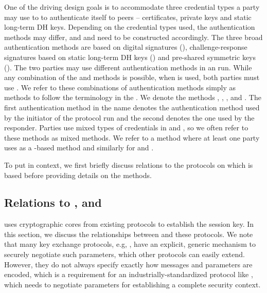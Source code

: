 One of the driving design goals is to accommodate three credential types
a party may use to to authenticate itself to peers -- certificates, private keys
and static long-term DH keys. Depending on the credential types used, the authentication methods may differ, and \mAuthi{} and \mAuthr{} need to be constructed accordingly.
%
%
The three broad authentication methods are based on digital signatures (\mSig), challenge-response signatures based on static long-term DH keys (\mStat) and pre-shared symmetric keys (\mPsk). The two parties may use different authentication methods in an \mEdhoc{} run.
%
While any combination of the \mSig{} and \mStat{} methods is possible, when \mPsk{} is used, both parties must use \mPsk{}.
%
We refer to these combinations of authentication methods simply as methods to follow the terminology in the \mSpec{}.
%
We denote the methods \mSigSig, \mSigStat, \mStatStat, \mStatSig{} and \mPskPsk.
%
The first authentication method in the name denotes the authentication method used by the initiator of the protocol run and the second denotes the one used by the responder.
%
Parties use mixed types of credentials in \mSigStat{} and \mStatSig{}, so
we often refer to these methods as mixed methods.
%
We refer to a method where at least one party uses \mSig{} as a \mSig-based method and similarly for \mStat{} and \mPsk.
%

To put \mEdhoc{} in context, we first briefly discuss relations to
the protocols on which \mEdhoc{} is based before providing details on the
methods.
%

\subsection{Relations to \mSigma, \mOptls{} and \mNoise{}}
\label{sec:relationsToOtherProtocols}
\mEdhoc{} uses cryptographic cores from existing protocols to
establish the session key. In this section, we discuss the relationships between \mEdhoc{} and these protocols.
%
%
%
We note that many key exchange protocols, e.g, \mSigma{}, have an explicit, generic mechanism to securely negotiate such parameters, which other protocols can easily extend. However, they do not always specify exactly how messages and parameters are encoded, which is a requirement for an industrially-standardized protocol like \mEdhoc{}, which needs to negotiate parameters for establishing a complete \mOscore{} security context.
%
%

